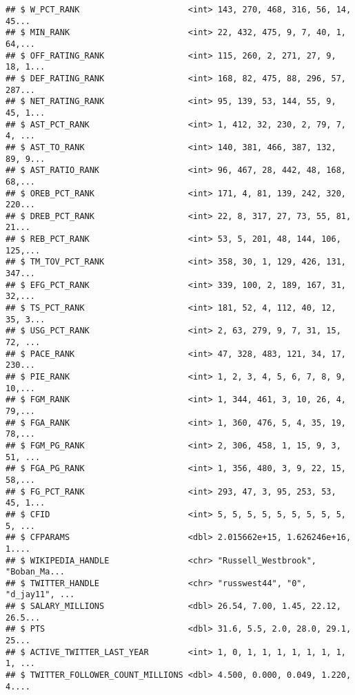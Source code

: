 \documentclass[]{article}
\begin{document}
\begin{verbatim}
## $ W_PCT_RANK                      <int> 143, 270, 468, 316, 56, 14, 45...
## $ MIN_RANK                        <int> 22, 432, 475, 9, 7, 40, 1, 64,...
## $ OFF_RATING_RANK                 <int> 115, 260, 2, 271, 27, 9, 18, 1...
## $ DEF_RATING_RANK                 <int> 168, 82, 475, 88, 296, 57, 287...
## $ NET_RATING_RANK                 <int> 95, 139, 53, 144, 55, 9, 45, 1...
## $ AST_PCT_RANK                    <int> 1, 412, 32, 230, 2, 79, 7, 4, ...
## $ AST_TO_RANK                     <int> 140, 381, 466, 387, 132, 89, 9...
## $ AST_RATIO_RANK                  <int> 96, 467, 28, 442, 48, 168, 68,...
## $ OREB_PCT_RANK                   <int> 171, 4, 81, 139, 242, 320, 220...
## $ DREB_PCT_RANK                   <int> 22, 8, 317, 27, 73, 55, 81, 21...
## $ REB_PCT_RANK                    <int> 53, 5, 201, 48, 144, 106, 125,...
## $ TM_TOV_PCT_RANK                 <int> 358, 30, 1, 129, 426, 131, 347...
## $ EFG_PCT_RANK                    <int> 339, 100, 2, 189, 167, 31, 32,...
## $ TS_PCT_RANK                     <int> 181, 52, 4, 112, 40, 12, 35, 3...
## $ USG_PCT_RANK                    <int> 2, 63, 279, 9, 7, 31, 15, 72, ...
## $ PACE_RANK                       <int> 47, 328, 483, 121, 34, 17, 230...
## $ PIE_RANK                        <int> 1, 2, 3, 4, 5, 6, 7, 8, 9, 10,...
## $ FGM_RANK                        <int> 1, 344, 461, 3, 10, 26, 4, 79,...
## $ FGA_RANK                        <int> 1, 360, 476, 5, 4, 35, 19, 78,...
## $ FGM_PG_RANK                     <int> 2, 306, 458, 1, 15, 9, 3, 51, ...
## $ FGA_PG_RANK                     <int> 1, 356, 480, 3, 9, 22, 15, 58,...
## $ FG_PCT_RANK                     <int> 293, 47, 3, 95, 253, 53, 45, 1...
## $ CFID                            <int> 5, 5, 5, 5, 5, 5, 5, 5, 5, 5, ...
## $ CFPARAMS                        <dbl> 2.015662e+15, 1.626246e+16, 1....
## $ WIKIPEDIA_HANDLE                <chr> "Russell_Westbrook", "Boban_Ma...
## $ TWITTER_HANDLE                  <chr> "russwest44", "0", "d_jay11", ...
## $ SALARY_MILLIONS                 <dbl> 26.54, 7.00, 1.45, 22.12, 26.5...
## $ PTS                             <dbl> 31.6, 5.5, 2.0, 28.0, 29.1, 25...
## $ ACTIVE_TWITTER_LAST_YEAR        <int> 1, 0, 1, 1, 1, 1, 1, 1, 1, 1, ...
## $ TWITTER_FOLLOWER_COUNT_MILLIONS <dbl> 4.500, 0.000, 0.049, 1.220, 4....
\end{verbatim}
\end{document}
